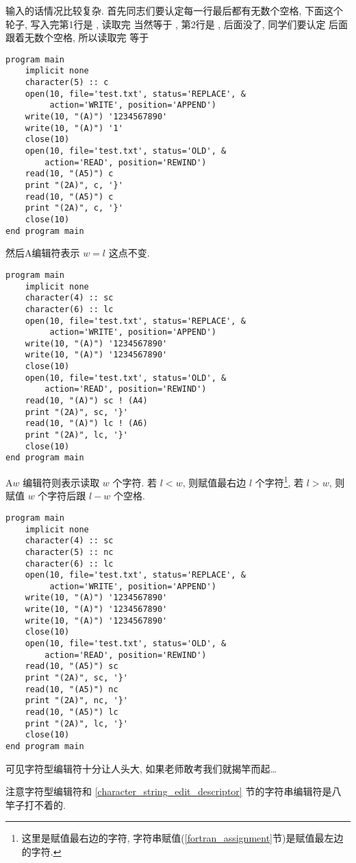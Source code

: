 输入的话情况比较复杂. 首先同志们要认定每一行最后都有无数个空格, 下面这个轮子, 写入完第1行是 , 读取完  当然等于 , 第2行是 , 后面没了, 同学们要认定  后面跟着无数个空格, 所以读取完  等于  
\begin{lstlisting}
program main
    implicit none
    character(5) :: c
    open(10, file='test.txt', status='REPLACE', &
         action='WRITE', position='APPEND')
    write(10, "(A)") '1234567890'
    write(10, "(A)") '1'
    close(10)
    open(10, file='test.txt', status='OLD', &
        action='READ', position='REWIND')
    read(10, "(A5)") c
    print "(2A)", c, '}'
    read(10, "(A5)") c
    print "(2A)", c, '}'
    close(10)
end program main
\end{lstlisting}
然后A编辑符表示 $ w=l $ 这点不变. 
\begin{lstlisting}
program main
    implicit none
    character(4) :: sc
    character(6) :: lc
    open(10, file='test.txt', status='REPLACE', &
         action='WRITE', position='APPEND')
    write(10, "(A)") '1234567890'
    write(10, "(A)") '1234567890'
    close(10)
    open(10, file='test.txt', status='OLD', &
        action='READ', position='REWIND')
    read(10, "(A)") sc ! (A4)
    print "(2A)", sc, '}'
    read(10, "(A)") lc ! (A6)
    print "(2A)", lc, '}'
    close(10)
end program main
\end{lstlisting}
A$ w $ 编辑符则表示读取 $ w $ 个字符. 若 $ l<w $, 则赋值最右边 $ l $ 个字符\footnote{这里是赋值最右边的字符, 字符串赋值(\ref{fortran_assignment}节)是赋值最左边的字符.}, 若 $ l>w $, 则赋值 $ w $ 个字符后跟 $ l-w $ 个空格. 
\begin{lstlisting}
program main
    implicit none
    character(4) :: sc
    character(5) :: nc
    character(6) :: lc
    open(10, file='test.txt', status='REPLACE', &
         action='WRITE', position='APPEND')
    write(10, "(A)") '1234567890'
    write(10, "(A)") '1234567890'
    write(10, "(A)") '1234567890'
    close(10)
    open(10, file='test.txt', status='OLD', &
        action='READ', position='REWIND')
    read(10, "(A5)") sc
    print "(2A)", sc, '}'
    read(10, "(A5)") nc
    print "(2A)", nc, '}'
    read(10, "(A5)") lc
    print "(2A)", lc, '}'
    close(10)
end program main
\end{lstlisting}

可见字符型编辑符十分让人头大, 如果老师敢考我们就揭竿而起\dots{}

注意字符型编辑符和 \ref{character_string_edit_descriptor} 节的字符串编辑符是八竿子打不着的. 

